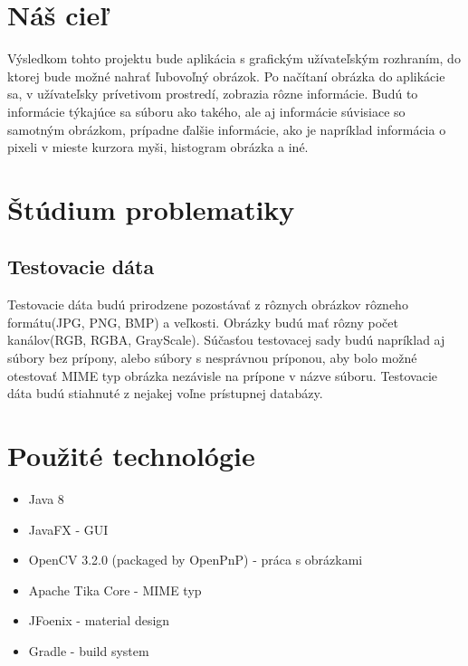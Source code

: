 \documentclass[12pt,a4paper,titlepage,final]{article}
\begin{document}
\section{Náš cieľ}\label{Ciel}
Výsledkom tohto projektu bude aplikácia s grafickým užívateľským rozhraním, do ktorej bude možné nahrať ľubovoľný obrázok. Po načítaní obrázka do aplikácie sa, v užívateľsky prívetivom prostredí, zobrazia rôzne informácie. Budú to informácie týkajúce sa súboru ako takého, ale aj informácie súvisiace so samotným obrázkom, prípadne ďalšie informácie, ako je napríklad informácia o pixeli v mieste kurzora myši, histogram obrázka a iné.

\section{Štúdium problematiky}
\ifdefined\whos

\fi

\subsection{Testovacie dáta}
Testovacie dáta budú prirodzene pozostávať z rôznych obrázkov rôzneho formátu(JPG, PNG, BMP) a veľkosti. Obrázky budú mať rôzny počet kanálov(RGB, RGBA, GrayScale). Súčasťou testovacej sady budú napríklad aj súbory bez prípony, alebo súbory s nesprávnou príponou, aby bolo možné otestovať MIME typ obrázka nezávisle na prípone v názve súboru.
Testovacie dáta budú stiahnuté z nejakej voľne prístupnej databázy.

\section{Použité technológie}
\begin{itemize}
	\item Java 8
	\item JavaFX - GUI
	\item OpenCV 3.2.0 (packaged by OpenPnP) - práca s obrázkami
	\item Apache Tika Core - MIME typ
	\item JFoenix - material design
	\item Gradle - build system
\end{itemize}

\end{document}
